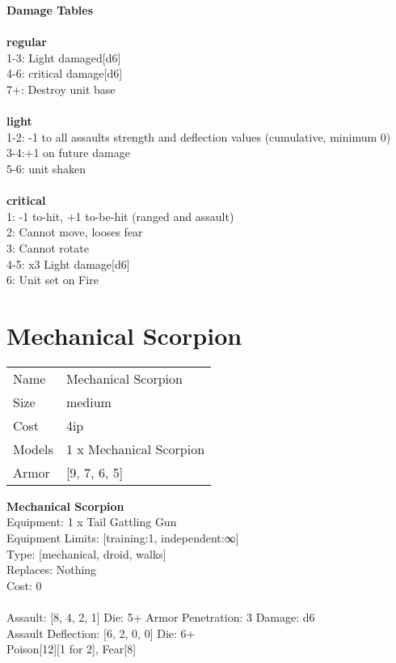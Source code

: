 {\bf Damage Tables} \\
\ \\ {\bf regular } \\
1-3: Light damaged[d6] \\
4-6: critical damage[d6] \\
7+: Destroy unit base \\
\ \\ {\bf light } \\
1-2: -1 to all assaults strength and deflection values (cumulative, minimum 0) \\
3-4:+1 on future damage \\
5-6: unit shaken \\
\ \\ {\bf critical } \\
1: -1 to-hit, +1 to-be-hit (ranged and assault) \\
2: Cannot move, looses fear \\
3: Cannot rotate \\
4-5: x3 Light damage[d6] \\
6: Unit set on Fire \\










\pagebreak\pagebreak

\section{ Mechanical Scorpion }

\begin{tabular}{ll}
  Name & Mechanical Scorpion \\
  Size & medium\\
  Cost & 4ip\\
  Models & 1 x Mechanical Scorpion\\
  Armor & [9, 7, 6, 5]\\
\end{tabular}

\noindent 

{\bf Mechanical Scorpion } \\
Equipment: 1 x Tail Gattling Gun \\
Equipment Limits: [training:1, independent:∞] \\
Type: [mechanical, droid, walks] \\
Replaces: Nothing \\
Cost: 0\\
\ \\
Assault: [8, 4, 2, 1] Die: 5+ Armor Penetration: 3 Damage: d6 \\
Assault Deflection: [6, 2, 0, 0] Die: 6+\\
\indent Poison[12][1 for 2], Fear[8]\\ 
 
